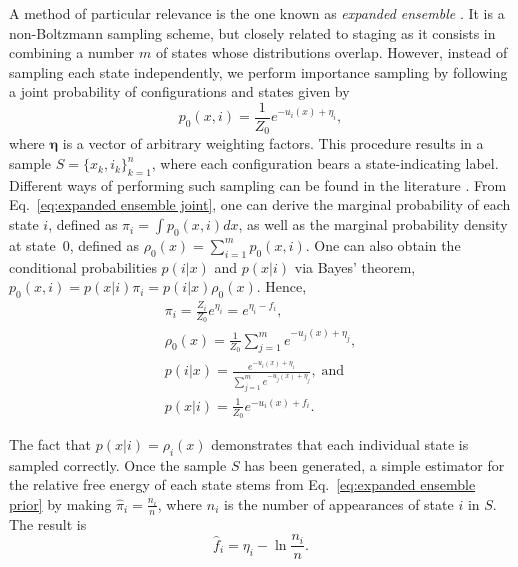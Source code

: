 \documentclass[journal=jctcce,manuscript=article,layout=twocolumn]{achemso}
\newcommand{\vt}[1]{\boldsymbol{\mathbf{#1}}}   %
\begin{document}
A method of particular relevance is the one known as \textit{expanded ensemble} \cite{Lyubartsev_1992}. It is a non-Boltzmann sampling scheme, but closely related to staging as it consists in combining a number $m$ of states whose distributions overlap. However, instead of sampling each state independently, we perform importance sampling by following a joint probability of configurations and states given by \cite{Nymeyer_2010}
\begin{equation}
\label{eq:expanded ensemble joint}
p_0(x, i) = \frac{1}{Z_0} e^{-u_i(x) + \eta_i},
\end{equation}
where $\vt \eta$ is a vector of arbitrary weighting factors. This procedure results in a sample $S = \{x_k,i_k\}_{k=1}^n$, where each configuration bears a state-indicating label. Different ways of performing such sampling can be found in the literature \cite{Lyubartsev_1992, Nymeyer_2010, Christ_2007, *Christ_2008, *Christ_2009, Katzgraber_2006, *Trebst_2006, Escobedo_2007, *Escobedo_2008, *Martinez_2008, Chodera_2011, Ding_2017}. From Eq.~\eqref{eq:expanded ensemble joint}, one can derive the marginal probability of each state $i$, defined as $\pi_i = \int p_0(x,i)dx$, as well as the marginal probability density at state~$0$, defined as $\rho_0(x) = \sum_{i=1}^m p_0(x,i)$. One can also obtain the conditional probabilities $p(i|x)$ and $p(x|i)$ via Bayes' theorem, $p_0(x,i) = p(x|i) \pi_i = p(i|x) \rho_0(x)$. Hence,
\begin{subequations}
	\label{eq:expanded ensemble probabilities}
	\begin{gather}
	\pi_i = \frac{Z_i}{Z_0} e^{\eta_i} = e^{\eta_i - f_i}, \label{eq:expanded ensemble prior} \\
	\rho_0(x) = \frac{1}{Z_0} \sum_{j=1}^m e^{-u_j(x) + \eta_j}, \label{eq:expanded ensemble evidence} \\
	p(i|x) = \frac{e^{-u_i(x) + \eta_i}}{\sum_{j=1}^m e^{-u_j(x) + \eta_j}}, \; \text{and} \label{eq:expanded ensemble posterior} \\
	p(x|i) = \frac{1}{Z_0} e^{-u_i(x) + f_i}. \label{eq:expanded ensemble likelihood}
	\end{gather}
\end{subequations}

The fact that $p(x|i) = \rho_i(x)$ demonstrates that each individual state is sampled correctly. Once the sample $S$ has been generated, a simple estimator for the relative free energy of each state stems from Eq.~\eqref{eq:expanded ensemble prior} by making $\hat \pi_i = \frac{n_i}{n}$, where $n_i$ is the number of appearances of state $i$ in $S$. The result is
\begin{equation}
\label{eq:expanded ensemble histogram estimator}
\hat f_i = \eta_i - \ln \frac{n_i}{n}.
\end{equation}
\end{document}
